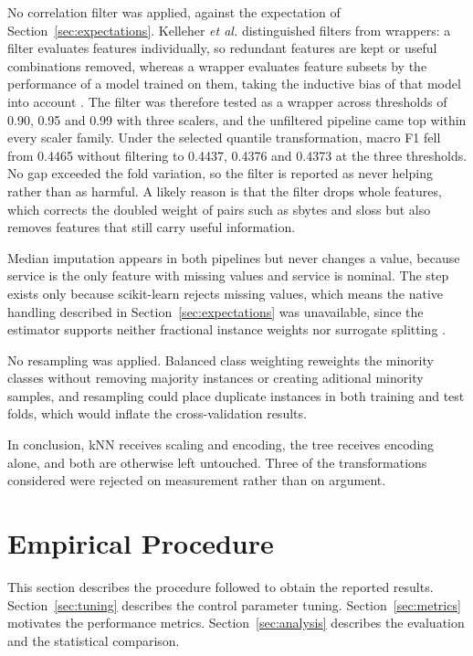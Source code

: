 \documentclass[conference]{IEEEtran}
\begin{document}
No correlation filter was applied, against the expectation of
Section~\ref{sec:expectations}. Kelleher \textit{et al.} distinguished filters
from wrappers: a filter evaluates features individually, so redundant features
are kept or useful combinations removed, whereas a wrapper evaluates feature
subsets by the performance of a model trained on them, taking the inductive
bias of that model into account \cite{kelleher2015}. The filter was therefore
tested as a wrapper across thresholds of 0.90, 0.95 and 0.99 with three
scalers, and the unfiltered pipeline came top within every scaler family. Under
the selected quantile transformation, macro F1 fell from 0.4465 without
filtering to 0.4437, 0.4376 and 0.4373 at the three thresholds. No gap exceeded
the fold variation, so the filter is reported as never helping rather than as
harmful. A likely reason is that the filter drops whole features, which
corrects the doubled weight of pairs such as sbytes and sloss but also removes
features that still carry useful information.

Median imputation appears in both pipelines but never changes a value, because
service is the only feature with missing values and service is nominal. The
step exists only because scikit-learn rejects missing values, which means the
native handling described in Section~\ref{sec:expectations} was unavailable,
since the estimator supports neither fractional instance weights \cite{topic4}
nor surrogate splitting \cite{wang1997}.

No resampling was applied. Balanced class weighting reweights the minority
classes without removing majority instances or creating aditional minority
samples, and resampling could place duplicate instances in both training and
test folds, which would inflate the cross-validation results.

In conclusion, kNN receives scaling and encoding, the tree receives encoding
alone, and both are otherwise left untouched. Three of the transformations
considered were rejected on measurement rather than on argument.
\section{Empirical Procedure}
\label{sec:empirical}

This section describes the procedure followed to obtain the reported results.
Section~\ref{sec:tuning} describes the control parameter tuning.
Section~\ref{sec:metrics} motivates the performance metrics.
Section~\ref{sec:analysis} describes the evaluation and the statistical
comparison.
\end{document}
